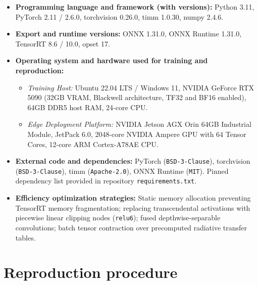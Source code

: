 \documentclass{article}
\begin{document}
\begin{itemize}[leftmargin=*]
\item \textbf{Programming language and framework (with versions):} Python 3.11, PyTorch 2.11 / 2.6.0, torchvision 0.26.0, timm 1.0.30, numpy 2.4.6.
\item \textbf{Export and runtime versions:} ONNX 1.31.0, ONNX Runtime 1.31.0, TensorRT 8.6 / 10.0, opset 17.
\item \textbf{Operating system and hardware used for training and reproduction:}
  \begin{itemize}
    \item \emph{Training Host:} Ubuntu 22.04 LTS / Windows 11, NVIDIA GeForce RTX 5090 (32GB VRAM, Blackwell architecture, TF32 and BF16 enabled), 64GB DDR5 host RAM, 24-core CPU.
    \item \emph{Edge Deployment Platform:} NVIDIA Jetson AGX Orin 64GB Industrial Module, JetPack 6.0, 2048-core NVIDIA Ampere GPU with 64 Tensor Cores, 12-core ARM Cortex-A78AE CPU.
  \end{itemize}
\item \textbf{External code and dependencies:}
  PyTorch (\texttt{BSD-3-Clause}), torchvision (\texttt{BSD-3-Clause}), timm (\texttt{Apache-2.0}), ONNX Runtime (\texttt{MIT}). Pinned dependency list provided in repository \texttt{requirements.txt}.
\item \textbf{Efficiency optimization strategies:}
  Static memory allocation preventing TensorRT memory fragmentation; replacing transcendental activations with piecewise linear clipping nodes (\texttt{relu6}); fused depthwise-separable convolutions; batch tensor contraction over precomputed radiative transfer tables.
\end{itemize}

\section{Reproduction procedure}\label{sec:repro}
\end{document}
